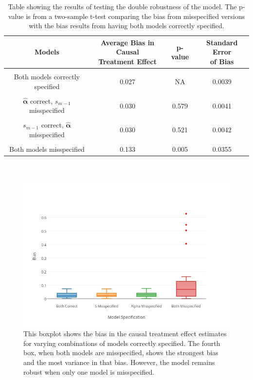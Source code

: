 \begin{table}[h!]
\centering
\begin{tabular} {c | c  c c}
Models & \shortstack{Average Bias in Causal \\ Treatment Effect} & p-value & \shortstack{Standard Error\\ of Bias} \\ 
\hline  \\
Both models correctly specified &0.027 & NA  & 0.0039\\ \\
$\hat{\mathbf{\alpha}}$ correct, $s_{m-1}$ misspecified & 0.030 & 0.579 & 0.0041\\ \\
$s_{m-1}$ correct, $\hat{\mathbf{\alpha}}$ misspecified& 0.030 & 0.521 &0.0042 \\ \\
Both models misspecified & 0.133 & 0.005 & 0.0355 
\end{tabular} \\
\centering
\caption[Testing double robustness]{Table showing the results of testing the double robustness of the model.  The p-value is from a two-sample t-test comparing the bias from misspecified versions with the bias results from having both models correctly specified. \label{doubletest}}
\end{table}

\begin{figure}[h!] 
\includegraphics[width = \linewidth]{figures/boxplot.jpg}
\caption[Boxplot of test of double robustness]{This boxplot shows the bias in the causal treatment effect estimates for varying combinations of models correctly specified.  The fourth box, when both models are misspecified, shows the strongest bias and the most variance in that bias.  However, the model remains robust when only one model is misspecified.}
\label{boxplot}
\end{figure}


